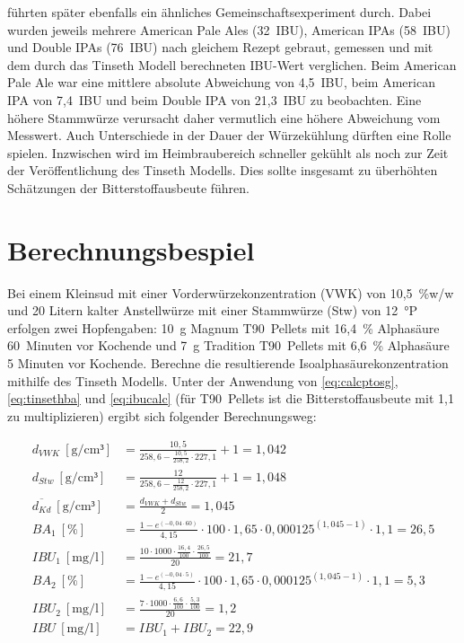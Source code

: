 \documentclass[a4paper,parskip=half]{scrartcl}
\newcommand{\BA}{\mathit{BA}}
\newcommand{\IBU}{\mathit{IBU}}
\newcommand{\uden}{\:[\text{g/cm³}]}
\newcommand{\uper}{\:[\text{\%}]}
\newcommand{\ucon}{\:[\text{mg/l}]}
\begin{document}
\textcite{Beechum2017} führten später ebenfalls ein ähnliches Gemeinschaftsexperiment durch. Dabei wurden jeweils mehrere American Pale Ales (32~IBU), American IPAs (58~IBU) und Double IPAs (76~IBU) nach gleichem Rezept gebraut, gemessen und mit dem durch das Tinseth Modell berechneten IBU-Wert verglichen. Beim American Pale Ale war eine mittlere absolute Abweichung von 4,5~IBU, beim American IPA von 7,4~IBU und beim Double IPA von 21,3~IBU zu beobachten. Eine höhere Stammwürze verursacht daher vermutlich eine höhere Abweichung vom Messwert. Auch Unterschiede in der Dauer der Würzekühlung dürften eine Rolle spielen. Inzwischen wird im Heimbraubereich schneller gekühlt als noch zur Zeit der Veröffentlichung des Tinseth Modells. Dies sollte insgesamt zu überhöhten Schätzungen der Bitterstoffausbeute führen.

\section*{Berechnungsbespiel}

Bei einem Kleinsud mit einer Vorderwürzekonzentration (VWK) von 10,5~\%w/w und 20 Litern kalter Anstellwürze  mit einer Stammwürze (Stw) von 12~°P erfolgen zwei Hopfengaben: 10~g Magnum T90~Pellets mit 16,4~\% Alphasäure 60~Minuten vor Kochende und 7~g Tradition T90~Pellets mit 6,6~\% Alphasäure 5 Minuten vor Kochende. Berechne die resultierende Isoalphasäurekonzentration mithilfe des Tinseth Modells. Unter der Anwendung von \autoref{eq:calcptosg}, \autoref{eq:tinsethba} und \autoref{eq:ibucalc} (für T90~Pellets ist die Bitterstoffausbeute mit 1,1 zu multiplizieren) ergibt sich folgender Berechnungsweg:

\begin{align*}
d_{VWK} \uden &= \frac{10,5}{258,6 - \frac{10,5}{258,2} \cdot 227,1} + 1 = 1,042 \\
d_{Stw} \uden &= \frac{12}{258,6 - \frac{12}{258,2} \cdot 227,1} + 1 = 1,048 \\
\overline{d_{\mathit{Kd}}} \uden &= \frac{d_{VWK} + d_{Stw}}{2} = 1,045 \\
\BA_{1} \uper &= \frac{1 - e^{\left(-0,04 \cdot 60 \right)}}{4,15} \cdot 100 \cdot 1,65 \cdot 0,000125^{\left(1,045 - 1 \right)} \cdot 1,1 = 26,5 \\
\IBU_{1} \ucon &= \frac{10 \cdot 1000 \cdot \frac{16,4}{100} \cdot \frac{26,5}{100}}{20} = 21,7 \\
\BA_{2} \uper &= \frac{1 - e^{\left(-0,04 \cdot 5 \right)}}{4,15} \cdot 100 \cdot 1,65 \cdot 0,000125^{\left(1,045 - 1 \right)} \cdot 1,1 = 5,3 \\
\IBU_{2} \ucon &= \frac{7 \cdot 1000 \cdot \frac{6,6}{100} \cdot \frac{5,3}{100}}{20} = 1,2 \\
\IBU \ucon &= \IBU_{1} + \IBU_{2} = 22,9
\end{align*}
\end{document}
